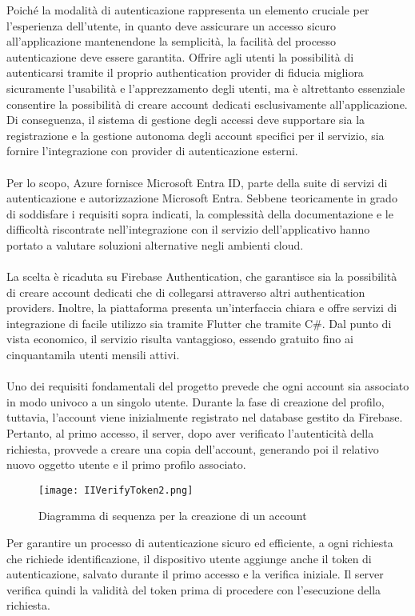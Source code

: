 Poiché la modalità di autenticazione rappresenta un elemento cruciale per l’esperienza dell’utente, 
in quanto deve assicurare un accesso sicuro all’applicazione mantenendone la semplicità, la facilità del processo autenticazione deve essere garantita.
Offrire agli utenti la possibilità di autenticarsi tramite il proprio authentication provider di fiducia migliora sicuramente l’usabilità e l’apprezzamento degli utenti, 
ma è altrettanto essenziale consentire la possibilità di creare account dedicati esclusivamente all’applicazione.
Di conseguenza, il sistema di gestione degli accessi deve supportare sia la registrazione e la gestione autonoma degli account specifici per il servizio, 
sia fornire l'integrazione con provider di autenticazione esterni.\\
\\
Per lo scopo, Azure fornisce Microsoft Entra ID, parte della suite di servizi di autenticazione e autorizzazione Microsoft Entra. 
Sebbene teoricamente in grado di soddisfare i requisiti sopra indicati, 
la complessità della documentazione e le difficoltà riscontrate nell’integrazione con il servizio dell’applicativo
 hanno portato a valutare soluzioni alternative negli ambienti cloud.\\
\\
La scelta è ricaduta su Firebase Authentication, che garantisce sia la possibilità di creare account dedicati che di collegarsi attraverso altri authentication providers. 
Inoltre, la piattaforma presenta un’interfaccia chiara e offre servizi di integrazione di facile utilizzo sia tramite Flutter che tramite C\#.
Dal punto di vista economico, il servizio risulta vantaggioso, essendo gratuito fino ai cinquantamila utenti mensili attivi.\\
\\
Uno dei requisiti fondamentali del progetto prevede che ogni account sia associato in modo univoco a un singolo utente. 
Durante la fase di creazione del profilo, tuttavia, l’account viene inizialmente registrato nel database gestito da Firebase. 
Pertanto, al primo accesso, il server, dopo aver verificato l’autenticità della richiesta, provvede a creare una copia dell’account, 
generando poi il relativo nuovo oggetto utente e il primo profilo associato.\\
\clearpage
\begin{figure}[h!]
    \centering
    \texttt{[image: IIVerifyToken2.png]}
    \caption{Diagramma di sequenza per la creazione di un account}
\end{figure}
Per garantire un processo di autenticazione sicuro ed efficiente, a ogni richiesta che richiede identificazione, 
il dispositivo utente aggiunge anche il token di autenticazione, salvato durante il primo accesso e la verifica iniziale. 
Il server verifica quindi la validità del token prima di procedere con l'esecuzione della richiesta.

